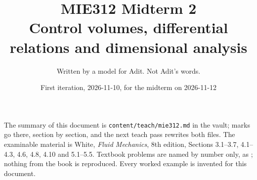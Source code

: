 
\title{MIE312 Midterm 2\\[0.3em]\large Control volumes, differential relations and dimensional analysis}
\author{Written by a model for Adit. Not Adit's words.}
\date{First iteration, 2026-11-10, for the midterm on 2026-11-12}


\maketitle

\begin{sloppypar}
The summary of this document is \texttt{content/teach/mie312.md} in the vault; marks go there, section by section, and the next teach pass rewrites both files. The examinable material is White, \emph{Fluid Mechanics}, 8th edition, Sections 3.1--3.7, 4.1--4.3, 4.6, 4.8, 4.10 and 5.1--5.5. Textbook problems are named by number only, as ; nothing from the book is reproduced. Every worked example is invented for this document.
\end{sloppypar}

\tableofcontents
\newpage





\newpage



















